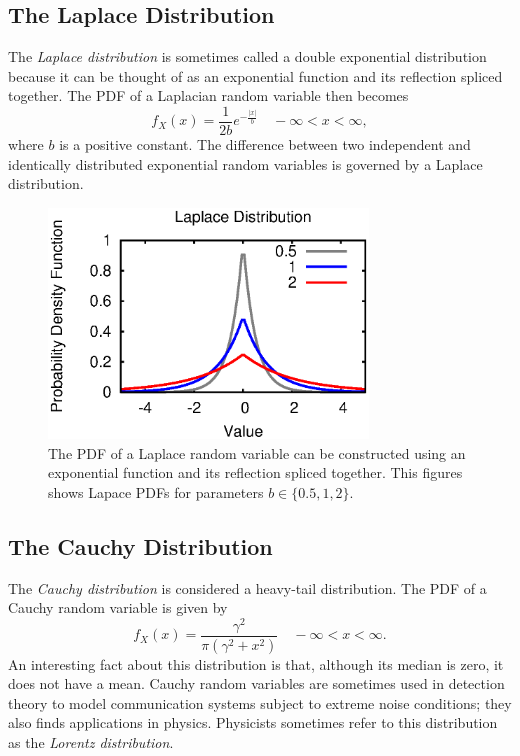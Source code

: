 \subsection{The Laplace Distribution}
The \emph{Laplace distribution} is sometimes called a double exponential distribution because it can be thought of as an exponential function and its reflection spliced together. 
The PDF of a Laplacian random variable then becomes
\begin{equation*}
f_X (x) = \frac{1}{2b} e^{- \frac{|x|}{b}} \quad - \infty < x < \infty,
\end{equation*}
where $b$ is a positive constant.
The difference between two independent and identically distributed exponential random variables is governed by a Laplace distribution.

\begin{figure}[ht]
\begin{center}
\includegraphics[width=8.5cm]{Figures/8chapter/laplace_pdf}
\end{center}
\caption{The PDF of a Laplace random variable can be constructed using an exponential function and its reflection spliced together.
This figures shows Lapace PDFs for parameters $b \in \{0.5, 1, 2 \}$.}
\end{figure}


\subsection{The Cauchy Distribution}
The \emph{Cauchy distribution} is considered a heavy-tail distribution. 
The PDF of a Cauchy random variable is given by
\begin{equation*}
f_X (x) = \frac{ \gamma^2 }{\pi \left( \gamma^2 + x^2 \right)} \quad - \infty < x < \infty.
\end{equation*}
An interesting fact about this distribution is that, although its median is zero, it does not have a mean.
Cauchy random variables are sometimes used in detection theory to model communication systems subject to extreme noise conditions; they also finds applications in physics.
Physicists sometimes refer to this distribution as the \emph{Lorentz distribution}.

